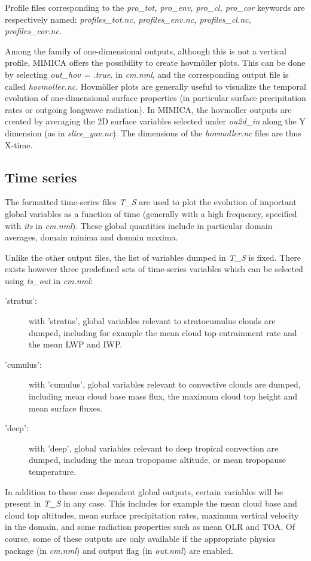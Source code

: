 \documentclass[12pt,A4,french]{article}
\begin{document}
Profile files corresponding to the {\it pro\_tot, pro\_env, pro\_cl, pro\_cor} keywords are respectively named: {\it profiles\_tot.nc, profiles\_env.nc, profiles\_cl.nc, profiles\_cor.nc}.

Among the family of one-dimensional outputs, although this is not a vertical profile, MIMICA offers the possibility to create hovm\"{o}ller plots. This can be done by selecting {\it out\_hov = .true.} in {\it cm.nml}, and the corresponding output file is called {\it hovmoller.nc}. Hovm\"{o}ller plots are generally useful to visualize the temporal evolution of one-dimensional surface properties (in particular surface precipitation rates or outgoing longwave radiation). In MIMICA, the hovmoller outputs are created by averaging the 2D surface variables selected under {\it ou2d\_in} along the Y dimension (as in {\it slice\_yav.nc}). The dimensions of the {\it hovmoller.nc} files are thus X-time.

\subsection{Time series}

The formatted time-series files {\it T\_S} are used to plot the evolution of important global variables as a function of time (generally with a high frequency, specified with {\it its} in {\it cm.nml}). These global quantities include in particular domain averages, domain minima and domain maxima.

Unlike the other output files, the list of variables dumped in {\it T\_S} is fixed. There exists however three predefined sets of time-series variables which can be selected using {\it ts\_out} in {\it cm.nml}:
\begin{description}
    \item['stratus':] with 'stratus', global variables relevant to stratocumulus clouds are dumped, including for example the mean cloud top entrainment rate and the mean LWP and IWP.
    \item['cumulus':] with 'cumulus', global variables relevant to convective clouds are dumped, including mean cloud base mass flux, the maximum cloud top height and mean surface fluxes. 
    \item['deep':] with 'deep', global variables relevant to deep tropical convection are dumped, including the mean tropopause altitude, or mean tropopause temperature.
\end{description}

In addition to these case dependent global outputs, certain variables will be present in {\it T\_S} in any case. This includes for example the mean cloud base and cloud top altitudes, mean surface precipitation rates, maximum vertical velocity in the domain, and some radiation properties such as mean OLR and TOA. Of course, some of these outputs are only available if the appropriate physics package (in {\it cm.nml}) and output flag (in {\it out.nml}) are enabled.
\end{document}
